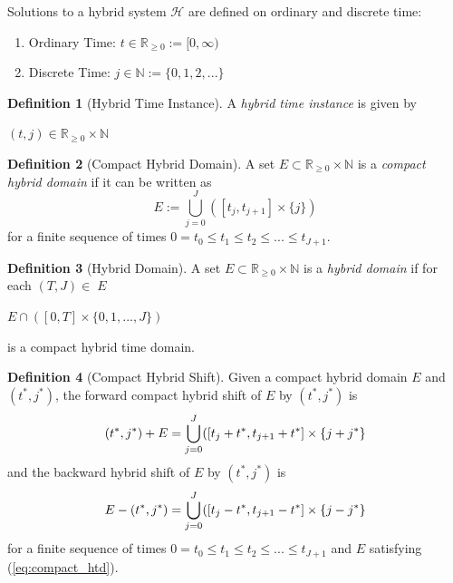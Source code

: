 \documentclass{article}
\theoremstyle{definition}
\newtheorem{definition}{Definition}[section]
\begin{document}
Solutions to a hybrid system $\mathcal{H}$ are defined on ordinary and discrete time:
\begin{enumerate}
    \item Ordinary Time: $t\in\mathbb{R}_{\geq0} :=  [0,\infty)$
    \item Discrete Time: $j\in\mathbb{N} := \{0,1,2,...\}$
\end{enumerate}
\begin{definition}[Hybrid Time Instance]
A \textit{hybrid time instance} is given by
\begin{center}
    $(t,j) \in \mathbb{R}_{\geq0} \times \mathbb{N}$
\end{center}
\end{definition}

\begin{definition}[Compact Hybrid Domain] A set $E \subset
    \mathbb{R}_{\geq0} \times \mathbb{N}$ is a  \textit{compact hybrid
    domain} if it can be written as
\begin{equation}
    \label{eq:compact_htd}
    E := \bigcup\limits_{j=0}^{J} ([t_j,t_{j+1}] \times \{j\})
\end{equation}
for a finite sequence of times $0 = t_0 \leq t_1 \leq t_2 \leq ... \leq t_{J+1}$.
\end{definition}

\begin{definition}[Hybrid Domain]
A set $E \subset \mathbb{R}_{\geq0} \times \mathbb{N}$ is a \textit{hybrid  domain} if for each $(T,J)\in\;E$
\begin{center}
    $E \cap ([0,T] \times \{0,1,...,J\})$
\end{center} 
is a compact hybrid time domain.
\end{definition}

\begin{definition}[Compact Hybrid Shift] Given a compact hybrid domain $E$
    and $(t^*,j^*)$, the forward {compact hybrid shift} of $E$ by $(t^*,j^*)$ is
\begin{equation}
    (t^*,j^*) + E = \bigcup\limits_{j=0}^{J} ([t_j + t^*,t_{j+1}+t^*] \times \{j+j^*\}\quad\\
\end{equation}
and the backward hybrid shift of $E$ by $(t^*,j^*)$ is
\begin{equation}
    E - (t^*,j^*) = \bigcup\limits_{j=0}^{J} ([t_j - t^*,t_{j+1}-t^*] \times \{j-j^*\}\\
\end{equation}
for a finite sequence of times $0 = t_0 \leq t_1 \leq t_2 \leq ... \leq t_{J+1}$
and $E$ satisfying (\ref{eq:compact_htd}).
\end{definition}
\end{document}

